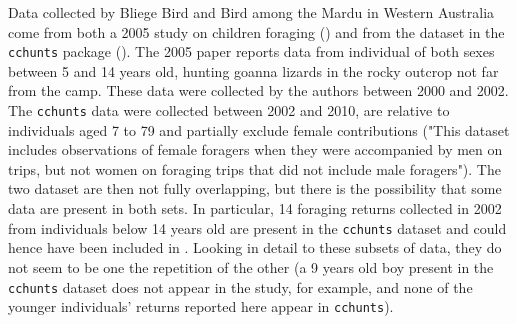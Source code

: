 Data collected by Bliege Bird and Bird among the Mardu in Western Australia come from both a 2005 study on children foraging (\cite{bird_mardu_2005}) and from the dataset in the \texttt{cchunts} package (\cite{koster_life_2020}). The 2005 paper reports data from individual of both sexes between 5 and 14 years old, hunting goanna lizards in the rocky outcrop not far from the camp. These data were collected by the authors between 2000 and 2002. The \texttt{cchunts} data were collected between 2002 and 2010, are relative to individuals aged 7 to 79 and partially exclude female contributions ("This dataset includes observations of female foragers when they were accompanied by men on trips, but not women on foraging trips that did not include male foragers"). The two dataset are then not fully overlapping, but there is the possibility that some data are present in both sets. In particular, 14 foraging returns collected in 2002 from individuals below 14 years old are present in the \texttt{cchunts} dataset and could hence have been included in \cite{bird_mardu_2005}. Looking in detail to these subsets of data, they do not seem to be one the repetition of the other (a 9 years old boy present in the \texttt{cchunts} dataset does not appear in the \cite{bird_mardu_2005} study, for example, and none of the younger individuals' returns reported here appear in \texttt{cchunts}). %





